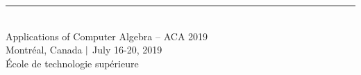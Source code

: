 \documentclass{article}
\newcommand{\HEADING}{
{\noindent \small Applications of Computer Algebra -- ACA 2019 \\
Montr\'eal, Canada $\small|$ July 16-20, 2019\\
\'Ecole de technologie sup\'erieure} \vspace{10pt}}
\begin{document}
	
\rule{\textwidth}{0.01 in}\\[-2em]
	
\HEADING	

\vspace{1cm}




\end{document}
